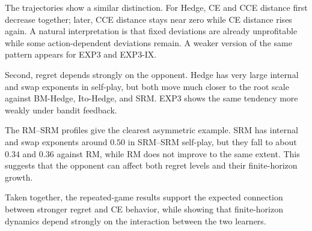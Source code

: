 The trajectories show a similar distinction. For Hedge, CE and CCE distance
first decrease together; later, CCE distance stays near zero while CE distance
rises again. A natural interpretation is that fixed deviations are already
unprofitable while some action-dependent deviations remain. A weaker version
of the same pattern appears for EXP3 and EXP3-IX.

Second, regret depends strongly on the opponent. Hedge has very large internal
and swap exponents in self-play, but both move much closer to the root scale
against BM-Hedge, Ito-Hedge, and SRM. EXP3 shows the same tendency more weakly
under bandit feedback.

The RM--SRM profiles give the clearest asymmetric example. SRM has internal
and swap exponents around \(0.50\) in SRM--SRM self-play, but they fall to
about \(0.34\) and \(0.36\) against RM, while RM does not improve to the same
extent. This suggests that the opponent can affect both regret levels and their
finite-horizon growth.

Taken together, the repeated-game results support the expected connection
between stronger regret and CE behavior, while showing that finite-horizon
dynamics depend strongly on the interaction between the two learners.
